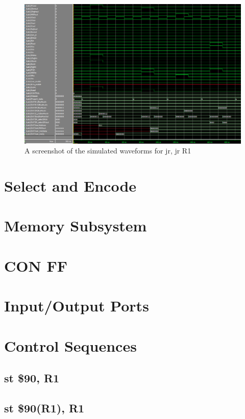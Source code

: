 \documentclass{article}
\begin{document}
        \begin{figure}[h!]
            \begin{center}
                \includegraphics[width=15cm]{jr_wave.png}
                \caption{A screenshot of the simulated waveforms for jr, jr R1}
            \end{center}
        \end{figure}


\appendix
\section{Select and Encode}
\section{Memory Subsystem}
\section{CON FF}
\section{Input/Output Ports}

\section{Control Sequences}
    \subsection{st \$90, R1} \label{st_case_1_sequence}
        
    \subsection{st \$90(R1), R1} \label{st_case_2_sequence}
        
\end{document}
